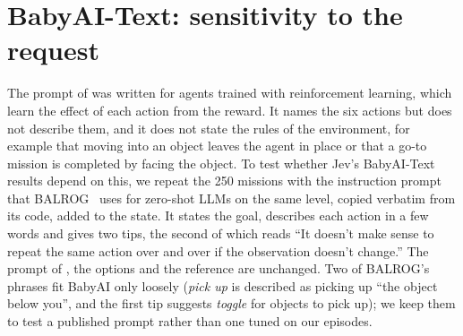 \documentclass[table]{article}
\begin{document}
\begin{table}[!htb]
\centering
\caption{Jev, Qwen3.8-27B and Gemma-4-E4B on TextWorld and BabyAI-Text by setting. Coin collector levels follow TextWorld's definition: a quest of 10 rooms without dead ends (10), with dead-end rooms off the chain (110), and with dead ends placed randomly (210). Treasure hunter levels 5, 15 and 25 are TextWorld's easy, medium and hard modes. Cooking: easy is one ingredient in one room; medium two ingredients that need cutting and cooking, in six rooms with closed containers and doors; hard three such ingredients in nine rooms. Progress: share of the game's points reached (TextWorld). Steps: mean steps per episode, failed episodes counting the full budget; Ref.\ steps: the same for the reference policy, which completes every episode. Success is given for all three models; Progress, Step acc.\ and Steps refer to Jev.}
\label{tab:textworld-babyai}
\footnotesize
\setlength{\tabcolsep}{4pt}

\end{table}

\section{BabyAI-Text: sensitivity to the request}
\label{app:babyai-instructions}

The prompt of \citet{carta2023grounding} was written for agents trained with reinforcement learning, which learn the effect of each action from the reward. It names the six actions but does not describe them, and it does not state the rules of the environment, for example that moving into an object leaves the agent in place or that a go-to mission is completed by facing the object. To test whether Jev's BabyAI-Text results depend on this, we repeat the 250 missions with the instruction prompt that BALROG~\cite{paglieri2025balrog} uses for zero-shot LLMs on the same level, copied verbatim from its code, added to the state. It states the goal, describes each action in a few words and gives two tips, the second of which reads ``It doesn't make sense to repeat the same action over and over if the observation doesn't change.'' The prompt of \citet{carta2023grounding}, the options and the reference are unchanged. Two of BALROG's phrases fit BabyAI only loosely (\emph{pick up} is described as picking up ``the object below you'', and the first tip suggests \emph{toggle} for objects to pick up); we keep them to test a published prompt rather than one tuned on our episodes.
\end{document}
